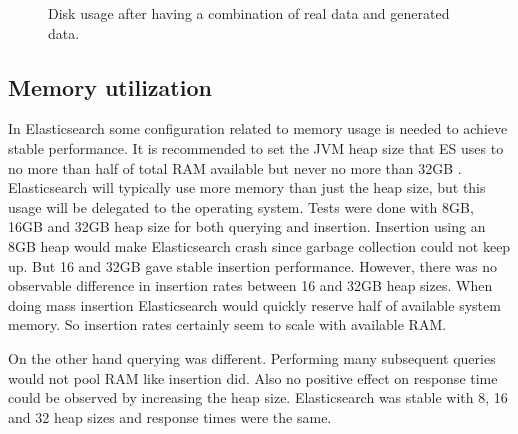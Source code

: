 \begin{figure}[h!]
\centering
{}
\caption{Disk usage after having a combination of real data and generated data.}
\label{fig:discbig}
\end{figure}

\subsection{Memory utilization}

In Elasticsearch some configuration related to memory usage is needed to achieve stable performance. It is recommended to set the JVM heap size that ES uses to no more than half of total RAM available but never no more than 32GB \cite{ESmemory}. Elasticsearch will typically use more memory than just the heap size, but this usage will be delegated to the operating system. Tests were done with 8GB, 16GB and 32GB heap size for both querying and insertion. Insertion using an 8GB heap would make Elasticsearch crash since garbage collection could not keep up. But 16 and 32GB gave stable insertion performance. However, there was no observable difference in insertion rates between 16 and 32GB heap sizes. When doing mass insertion Elasticsearch would quickly reserve half of available system memory. So insertion rates certainly seem to scale with available RAM.

On the other hand querying was different. Performing many subsequent queries would not pool RAM like insertion did. Also no positive effect on response time could be observed by increasing the heap size. Elasticsearch was stable with 8, 16 and 32 heap sizes and response times were the same. 

